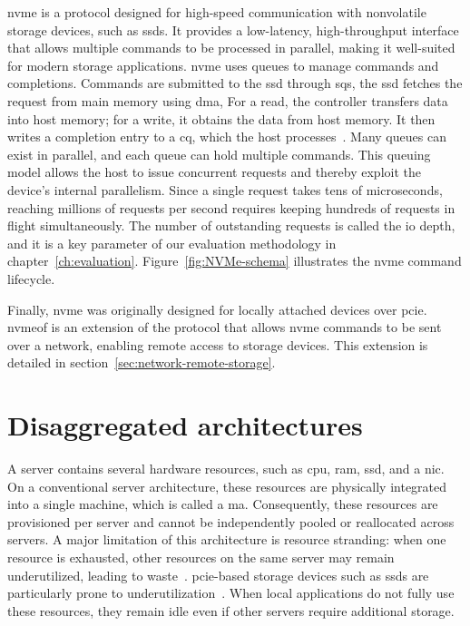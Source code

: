 \acrfull{nvme} is a protocol designed for high-speed communication with nonvolatile storage devices, such as \acrshort{ssd}s. It provides a low-latency, high-throughput interface that allows multiple commands to be processed in parallel, making it well-suited for modern storage applications. \acrshort{nvme} uses queues to manage commands and completions. Commands are submitted to the \acrshort{ssd} through \acrfull{sq}s, the \acrshort{ssd} fetches the request from main memory using \acrshort{dma}, For a read, the
controller transfers data into host memory; for a write, it obtains
the data from host memory. It then writes a completion entry to a
\acrfull{cq}, which the host processes~\cite[88--101]{nvme-express-base-specification-rev-2.4}. Many queues can exist in parallel, and each queue can hold multiple commands. This queuing model allows the host to issue concurrent requests and thereby exploit the device's internal parallelism. Since a single request takes tens of microseconds, reaching millions of requests per second requires keeping hundreds of requests in flight simultaneously. The number of outstanding requests is called the \acrshort{io} depth, and it is a key parameter of our evaluation methodology in chapter~\ref{ch:evaluation}. Figure~\ref{fig:NVMe-schema} illustrates the \acrshort{nvme} command lifecycle.

Finally, \acrshort{nvme} was originally designed for locally attached devices over \acrshort{pcie}. \acrfull{nvmeof} is an extension of the protocol that allows \acrshort{nvme} commands to be sent over a network, enabling remote access to storage devices. This extension is detailed in section~\ref{sec:network-remote-storage}.


\section{Disaggregated architectures} \label{sec:disaggregated-arch}

A server contains several hardware resources, such as \acrshort{cpu}, \acrshort{ram}, \acrshort{ssd}, and a \acrfull{nic}. On a conventional server architecture, these resources are physically integrated into a single machine, which is called a \acrfull{ma}. Consequently, these resources are provisioned per server and cannot be independently pooled or reallocated across servers. A major limitation of this architecture is resource stranding: when one resource is exhausted, other resources on the same server may remain underutilized, leading to waste~\cite{ruan_quicksand_2025}. \acrshort{pcie}-based storage devices such as \acrshort{ssd}s are particularly prone to underutilization~\cite{klimovic_flash_2016}.  When local applications do not fully use these resources, they remain idle even if other servers require additional storage.

